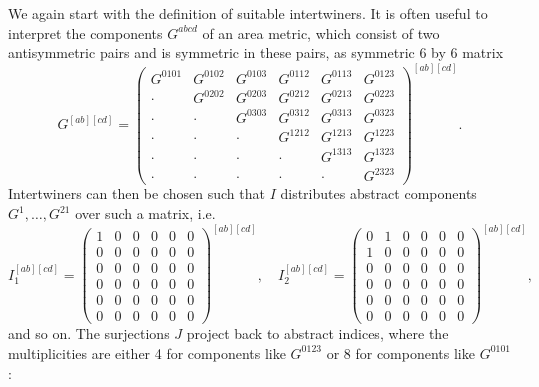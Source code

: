We again start with the definition of suitable intertwiners. It is often useful to interpret the components $G^{abcd}$ of an area metric, which consist of two antisymmetric pairs and is symmetric in these pairs, as symmetric 6 by 6 matrix
\begin{equation}\label{petrov}
  G^{[ab][cd]} =
  \begin{pmatrix}
    G^{0101} & G^{0102} & G^{0103} & G^{0112} & G^{0113} & G^{0123} \\
    \cdot & G^{0202} & G^{0203} & G^{0212} & G^{0213} & G^{0223} \\
    \cdot & \cdot & G^{0303} & G^{0312} & G^{0313} & G^{0323} \\
    \cdot & \cdot & \cdot & G^{1212} & G^{1213} & G^{1223} \\
    \cdot & \cdot & \cdot & \cdot & G^{1313} & G^{1323} \\
    \cdot & \cdot & \cdot & \cdot & \cdot & G^{2323}
  \end{pmatrix}^{[ab][cd]}.
\end{equation}
Intertwiners can then be chosen such that $I$ distributes abstract components $G^1,\dots,G^{21}$ over such a matrix, i.e.
\begin{equation}
  I^{[ab][cd]}_1 = \begin{pmatrix} 1 & 0 & 0 & 0 & 0 & 0 \\ 0 & 0 & 0 & 0 & 0 & 0 \\ 0 & 0 & 0 & 0 & 0 & 0 \\ 0 & 0 & 0 & 0 & 0 & 0 \\ 0 & 0 & 0 & 0 & 0 & 0 \\ 0 & 0 & 0 & 0 & 0 & 0 \end{pmatrix}^{[ab][cd]},\quad
  I^{[ab][cd]}_2 = \begin{pmatrix} 0 & 1 & 0 & 0 & 0 & 0 \\ 1 & 0 & 0 & 0 & 0 & 0 \\ 0 & 0 & 0 & 0 & 0 & 0 \\ 0 & 0 & 0 & 0 & 0 & 0 \\ 0 & 0 & 0 & 0 & 0 & 0 \\ 0 & 0 & 0 & 0 & 0 & 0 \end{pmatrix}^{[ab][cd]},
\end{equation}
and so on. The surjections $J$ project back to abstract indices, where the multiplicities are either 4 for components like $G^{0123}$ or 8 for components like $G^{0101}$:
